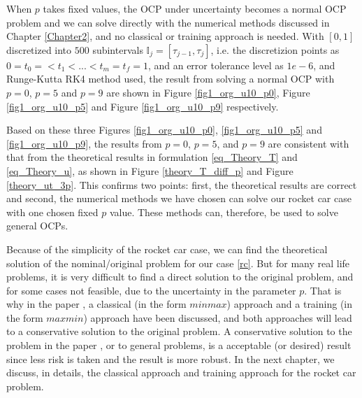 \documentclass  [
  paper    = a4,
  BCOR     = 10mm,
  twoside,
  fontsize = 12pt,
  fleqn,
  toc      = bibnumbered,
  toc      = listofnumbered,
  numbers  = noendperiod,
  headings = normal,
  listof   = leveldown,
  version  = 3.03
]                                       {scrreprt}
\newcommand{\<}{\langle}
\renewcommand{\>}{\rangle}
\begin{document}
When $p$ takes fixed values, the OCP under uncertainty becomes a normal OCP problem and we can solve directly with the numerical methods discussed in Chapter \ref{Chapter2}, and no classical or training approach is needed. With $[0,1]$ discretized into $500$ subintervals $\mathbb{I}_j = [\tau_{j-1}, \tau_j]$, i.e. the discretizion points as $0 = t_0 =  < t_1 < ... < t_m = t_f =1 $, and an error tolerance level as $1e-6$, and Runge-Kutta RK4 method used,  the result from solving a normal OCP with $p=0$, $p=5$ and $p=9$ are shown in Figure \ref{fig1_org_u10_p0}, Figure \ref{fig1_org_u10_p5} and Figure \ref{fig1_org_u10_p9} respectively. 

Based on these three Figures \ref{fig1_org_u10_p0},  \ref{fig1_org_u10_p5} and \ref{fig1_org_u10_p9}, the results from $p=0$,  $p=5$,  and $p=9$ are consistent with that from the theoretical results in formulation \ref{eq_Theory_T} and \ref{eq_Theory_u}, as shown in Figure \ref{theory_T_diff_p} and Figure \ref{theory_ut_3p}. This confirms two points: first, the theoretical results are correct and second, the numerical methods we have chosen can solve our rocket car case with one chosen fixed $p$ value. These methods can, therefore, be used to solve general OCPs.


Because of the simplicity of the rocket car case, we can find the theoretical solution of the nominal/original problem for our case \ref{rc}. But for many real life problems, it is very difficult to find a direct solution to the original problem, and for some cases not feasible, due to the uncertainty in the parameter $p$. That is why in the paper \cite{MatSch22}, a classical (in the form $minmax$) approach and a training (in the form $maxmin$) approach have been discussed, and both approaches will lead to a conservative solution to the original problem. A conservative solution to the problem in the paper \cite{MatSch22}, or to general problems,  is a acceptable (or desired) result since less risk is taken and the result is more robust. In the next chapter, we discuss, in details, the classical approach and training approach for the rocket car problem. %
\end{document}
